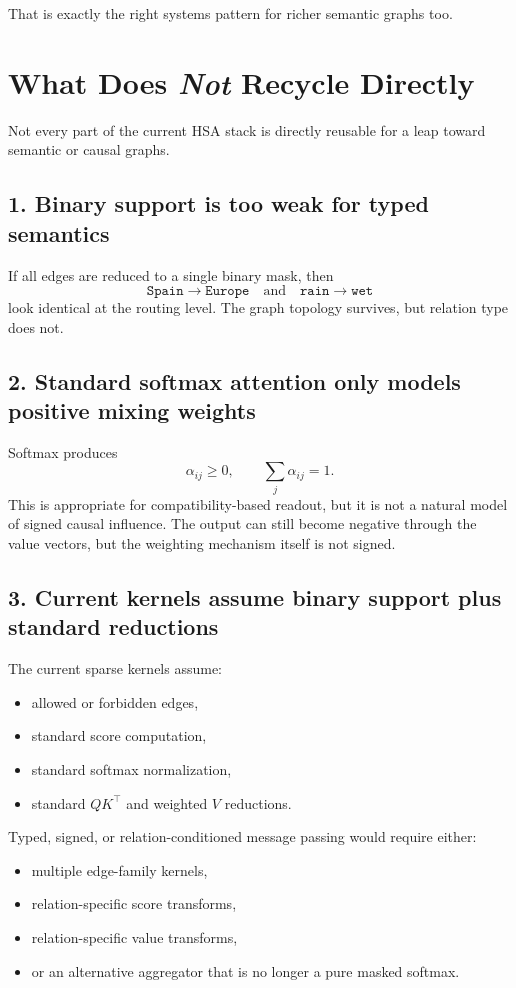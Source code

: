 \documentclass[11pt]{article}
\begin{document}
That is exactly the right systems pattern for richer semantic graphs too.

\section{What Does \emph{Not} Recycle Directly}

Not every part of the current HSA stack is directly reusable for a leap toward
semantic or causal graphs.

\subsection{1. Binary support is too weak for typed semantics}

If all edges are reduced to a single binary mask, then
\[
\texttt{Spain} \to \texttt{Europe}
\quad\text{and}\quad
\texttt{rain} \to \texttt{wet}
\]
look identical at the routing level. The graph topology survives, but relation
type does not.

\subsection{2. Standard softmax attention only models positive mixing weights}

Softmax produces
\[
\alpha_{ij} \ge 0, \qquad \sum_j \alpha_{ij} = 1.
\]
This is appropriate for compatibility-based readout, but it is not a natural
model of signed causal influence. The output can still become negative through
the value vectors, but the weighting mechanism itself is not signed.

\subsection{3. Current kernels assume binary support plus standard reductions}

The current sparse kernels assume:
\begin{itemize}[leftmargin=1.5em]
    \item allowed or forbidden edges,
    \item standard score computation,
    \item standard softmax normalization,
    \item standard $QK^\top$ and weighted $V$ reductions.
\end{itemize}

Typed, signed, or relation-conditioned message passing would require either:
\begin{itemize}[leftmargin=1.5em]
    \item multiple edge-family kernels,
    \item relation-specific score transforms,
    \item relation-specific value transforms,
    \item or an alternative aggregator that is no longer a pure masked softmax.
\end{itemize}
\end{document}
